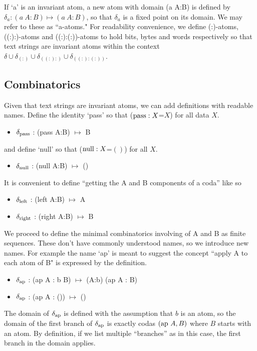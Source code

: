\documentclass[11pt]{article}
\begin{document}
If `a' is an invariant atom, a new atom with domain (a A:B) is defined by $\delta_a: (a\ A:B)\mapsto (a\ A:B)$, so that $\delta_a$ is a fixed point on its domain.  
We may refer to these as ``a-atoms."  For readability convenience, we define (:)-atoms, ((:):)-atoms and ((:):(:))-atoms to hold bits, bytes and words respectively
so that text strings are invariant atoms within the context $\delta\cup\delta_{(:)}\cup\delta_{((:):)}\cup\delta_{((:):(:))}$.

\subsection{Combinatorics} 

Given that text strings are invariant atoms, we can add definitions with readable names.  Define the identity `pass' so that (${\rm pass}:X$=$X$) for all data $X$.  
\begin{itemize}
\item{$\delta_{\rm pass}$ : ({\rm pass} A:B) $\mapsto$ B}
\end{itemize}
and define `null' so that (${\rm null}:X$=$()$) for all $X$.
\begin{itemize}
\item{$\delta_{\rm null}$ : ({\rm null} A:B) $\mapsto$ ()}
\end{itemize}
It is convenient to define ``getting the A and B components of a coda'' like so
\begin{itemize}
\item{$\delta_{\rm left}$ : ({\rm left} A:B) $\mapsto$ A} 
\item{$\delta_{\rm right}$ : ({\rm right} A:B) $\mapsto$ B} 
\end{itemize}
We proceed to define the minimal combinatorics involving of A and B as finite sequences.  These don't have 
commonly understood names, so we introduce new names.  For example the name `ap' is meant to suggest the 
concept ``apply A to each atom of B" is expressed by the definition.  
\begin{itemize}
\item{$\delta_{\rm ap}$ : ({\rm ap} A : b B) $\mapsto$ (A:b) ({\rm ap} A : B)}
\item{$\delta_{\rm ap}$ : ({\rm ap} A : ()) $\mapsto$ ()} 
\end{itemize} 
The domain of $\delta_{\rm ap}$ is defined with the assumption that $b$ is an atom, so the domain of the first branch of $\delta_{\rm ap}$ is exactly 
codas $({\rm ap}\ A,B)$ where $B$ starts with an atom.  By definition, if we list multiple ``branches'' as in this case, the first branch in the domain applies.  
\end{document}

